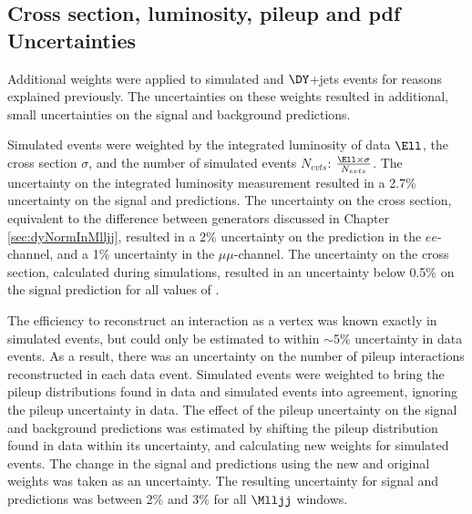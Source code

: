 \subsection{Cross section, luminosity, pileup and pdf Uncertainties}
\label{sec:crossSxnPileupPdfUnc}
Additional weights were applied to simulated \WR and $\DY$+jets events for reasons explained previously.  The uncertainties on 
these weights resulted in additional, small uncertainties on the signal and \DY background predictions.

Simulated events were weighted by the integrated luminosity of data $\Ell$, the cross section $\sigma$, and the number of 
simulated events $N_{evts}$: $\frac{\Ell \times \sigma}{N_{evts}}$.  The uncertainty on the integrated luminosity measurement 
resulted in a 2.7\% uncertainty on the signal and \DY predictions.  The uncertainty on the \DY cross section, equivalent to 
the difference between \DY \MC generators discussed in Chapter \ref{sec:dyNormInMlljj}, resulted in a 2\% uncertainty on the 
\DY prediction in the $ee$-channel, and a 1\% uncertainty in the $\mu\mu$-channel.  The uncertainty on the \WR cross section, 
calculated during simulations, resulted in an uncertainty below 0.5\% on the signal prediction for all values of \mWR.

The efficiency to reconstruct an interaction as a vertex was known exactly in simulated events, but could only be estimated 
to within $\sim$5\% uncertainty in data events.  As a result, there was an uncertainty on the number of pileup interactions 
reconstructed in each data event.  Simulated events were weighted to bring the pileup distributions found in data and simulated 
events into agreement, ignoring the pileup uncertainty in data.  The effect of the pileup uncertainty on the signal and 
background predictions was estimated by shifting the pileup distribution found in data within its uncertainty, and calculating 
new weights for simulated events.  The change in the signal and \DY predictions using the new and original weights was taken 
as an uncertainty.  The resulting uncertainty for signal and \DY predictions was between 2\% and 3\% for all $\Mlljj$ windows.


